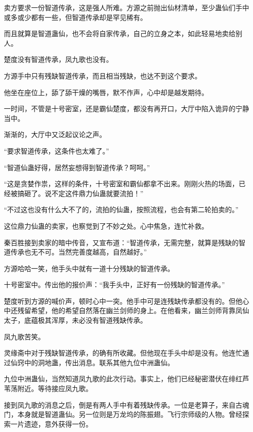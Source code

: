 
\begin{this_body}



卖方要求一份智道传承，这是强人所难。方源之前抛出仙材清单，至少蛊仙们手中或多或少都有一些，但智道传承却是罕见稀有。

而且就算是智道蛊仙，也不会将自家传承，自己的立身之本，如此轻易地卖给别人。

楚度没有智道传承，凤九歌也没有。

方源手中只有残缺智道传承，而且相当残缺，也达不到这个要求。

他坐在座位上，舔了舔干燥的嘴唇，默不作声，心中却是越发期待。

一时间，不管是十号密室，还是霸仙楚度，都没有再开口，大厅中陷入诡异的宁静当中。

渐渐的，大厅中又泛起议论之声。

“要求智道传承，这条件也太难了。”

“智道仙蛊好得，居然妄想得到智道传承？呵呵。”

“这是贪婪作祟，这样的条件，十号密室和霸仙都拿不出来。刚刚火热的场面，已经被搞砸了。说不定这件鼎力仙蛊就要流拍！”

“不过这也没有什么大不了的，流拍的仙蛊，按照流程，也会有第二轮拍卖的。”

这位鼎力仙蛊的卖家，也察觉到了不妙之处。心中焦急，连忙补救。

秦百胜接到卖家的暗中传音，又宣布道：“智道传承，无需完整，就算是残缺的智道传承也无不可。当然完善度越高，自然越好。”

方源哈哈一笑，他手头中就有一道十分残缺的智道传承。

十号密室中。传出他的报价声：“我手头中，正好有一份残缺的智道传承。”

楚度听到方源的喊价声，顿时心中一突。他手中可是连残缺传承都没有的。但他心中还残留希望，他的希望自然落在幽兰剑师的身上。在他看来，幽兰剑师背靠凤仙太子，底蕴极其浑厚，未必没有智道残缺传承。

凤九歌苦笑。

灵缘斋中对于残缺智道传承，的确有所收藏。但他现在手头中却是没有。他连忙通过仙窍中的洞地蛊，传出消息。联系其他九位中洲蛊仙。

九位中洲蛊仙，当然知道凤九歌的此次行动。事实上，他们已经秘密潜伏在绯红芦苇荡附近。等待接应凤九歌。

接到凤九歌的消息之后，倒是有两人手中有着残缺传承。一位是老算子，来自古魂门，本身就是智道蛊仙。另一位则是万龙坞的陈振翅。飞行宗师级的人物。曾经探索一片遗迹，意外获得一份。


\end{this_body}

